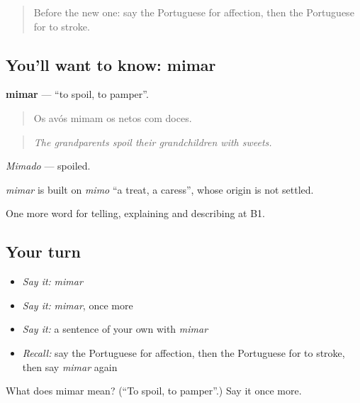 \label{lesson:PT-C496-mimar}



\begin{quote}
Before the new one: say the Portuguese for affection, then the Portuguese for to stroke.
\end{quote}

\subsection*{You'll want to know: mimar}
\textbf{mimar} — \textquotedblleft{}to spoil, to pamper\textquotedblright{}.

\begin{quote}
Os avós mimam os netos com doces.
\end{quote}

\begin{quote}
\emph{The grandparents spoil their grandchildren with sweets.}
\end{quote}

\emph{Mimado} — spoiled.

\begin{cousinweb}
\emph{mimar} is built on \emph{mimo} \textquotedblleft{}a treat, a caress\textquotedblright{}, whose origin is not settled.
\end{cousinweb}

\begin{grammarlens}[title={What you've built}]
One more word for telling, explaining and describing at B1.
\end{grammarlens}

\subsection*{Your turn}
\begin{itemize}
\raggedright
  \item \emph{Say it:} \emph{mimar}
  \item \emph{Say it:} \emph{mimar}, once more
  \item \emph{Say it:} a sentence of your own with \emph{mimar}
  \item \emph{Recall:} say the Portuguese for affection, then the Portuguese for to stroke, then say \emph{mimar} again
\end{itemize}

\begin{tcolorbox}[breakable,colback=teal!4,colframe=teal!35!black,title={Before you move on}]
What does mimar mean? (\textquotedblleft{}To spoil, to pamper\textquotedblright{}.) Say it once more.
\end{tcolorbox}
